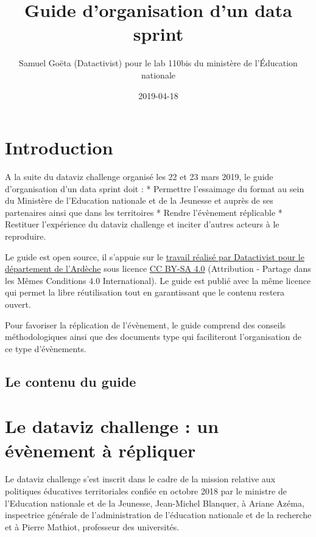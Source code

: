 \documentclass[]{book}
\title{Guide d'organisation d'un data sprint}
\author{Samuel Goëta (Datactivist) pour le lab 110bis du ministère de
l'Éducation nationale}
\date{2019-04-18}
\begin{document}
\maketitle

{
\setcounter{tocdepth}{1}
\tableofcontents
}
\chapter{Introduction}\label{introduction}

A la suite du dataviz challenge organisé les 22 et 23 mars 2019, le
guide d'organisation d'un data sprint doit : * Permettre l'essaimage du
format au sein du Ministère de l'Education nationale et de la Jeunesse
et auprès de ses partenaires ainsi que dans les territoires * Rendre
l'évènement réplicable * Restituer l'expérience du dataviz challenge et
inciter d'autres acteurs à le reproduire.

Le guide est open source, il s'appuie sur le
\href{https://docs.google.com/document/d/1uDw4Maifjl_egJ95y-F0dkXEyu2MNfhc2GvNEmjhPq8/edit\#heading=h.9ofnjz67swln}{travail
réalisé par Datactivist pour le département de l'Ardèche} sous licence
\href{https://creativecommons.org/licenses/by-sa/4.0/deed.fr}{CC BY-SA
4.0} (Attribution - Partage dans les Mêmes Conditions 4.0
International). Le guide est publié avec la même licence qui permet la
libre réutilisation tout en garantissant que le contenu restera ouvert.

Pour favoriser la réplication de l'évènement, le guide comprend des
conseils méthodologiques ainsi que des documents type qui faciliteront
l'organisation de ce type d'évènements.

\section{Le contenu du guide}\label{le-contenu-du-guide}

\chapter{Le dataviz challenge : un évènement à répliquer}\label{dataviz}

Le dataviz challenge s'est inscrit dans le cadre de la mission relative
aux politiques éducatives territoriales confiée en octobre 2018 par le
ministre de l'Education nationale et de la Jeunesse, Jean-Michel
Blanquer, à Ariane Azéma, inspectrice générale de l'administration de
l'éducation nationale et de la recherche et à Pierre Mathiot, professeur
des universités.
\end{document}
